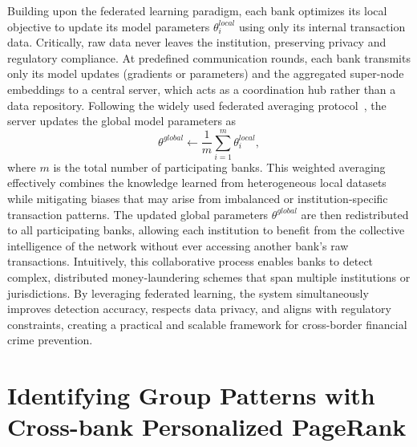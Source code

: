 \documentclass[11pt,english]{article}
\begin{document}

Building upon the federated learning paradigm, each bank optimizes its local objective to update its model parameters $\theta_i^{local}$ using only its internal transaction data. Critically, raw data never leaves the institution, preserving privacy and regulatory compliance. At predefined communication rounds, each bank transmits only its model updates (gradients or parameters) and the aggregated super-node embeddings to a central server, which acts as a coordination hub rather than a data repository. Following the widely used federated averaging protocol~\parencite{zhang2021survey, li2020review}, the server updates the global model parameters as
\begin{equation}
    \theta^{global} \leftarrow \frac{1}{m} \sum_{i=1}^{m} \theta_i^{local},
\end{equation}
where $m$ is the total number of participating banks. This weighted averaging effectively combines the knowledge learned from heterogeneous local datasets while mitigating biases that may arise from imbalanced or institution-specific transaction patterns. The updated global parameters $\theta^{global}$ are then redistributed to all participating banks, allowing each institution to benefit from the collective intelligence of the network without ever accessing another bank’s raw transactions. Intuitively, this collaborative process enables banks to detect complex, distributed money-laundering schemes that span multiple institutions or jurisdictions. By leveraging federated learning, the system simultaneously improves detection accuracy, respects data privacy, and aligns with regulatory constraints, creating a practical and scalable framework for cross-border financial crime prevention.



\section{Identifying Group Patterns with Cross-bank Personalized PageRank}
\end{document}
